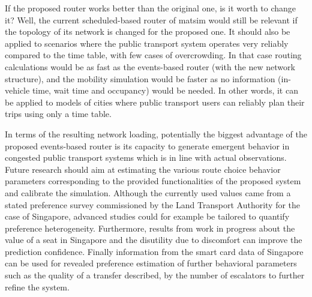 If the proposed router works better than the original one, is it worth to change it? Well, the current scheduled-based router of \gls{matsim} would still be relevant if the topology of its network is changed for the proposed one. It should also be applied to scenarios where the public transport system operates very reliably compared to the time table, with few cases of overcrowding. In that case routing calculations would be as fast as the events-based router (with the new network structure), and the mobility simulation would be faster as no information (in-vehicle time, wait time and occupancy) would be needed. In other words, it can be applied to models of cities where public transport users can reliably plan their trips using only a time table.

In terms of the resulting network loading, potentially the biggest advantage of the proposed events-based router is its capacity to generate emergent behavior in congested public transport systems which is in line with actual observations. Future research should aim at estimating the various route choice behavior parameters corresponding to the provided functionalities of the proposed system and calibrate the simulation. Although the currently used values came from a stated preference survey commissioned by the Land Transport Authority for the case of Singapore, advanced studies could for example be tailored to quantify preference heterogeneity. Furthermore, results from work in progress about the value of a seat in Singapore and the disutility due to discomfort can improve the prediction confidence. Finally information from the smart card data of Singapore can be used for revealed preference estimation of further behavioral parameters such as the quality of a transfer described, \eg by the number of escalators to further refine the system.





